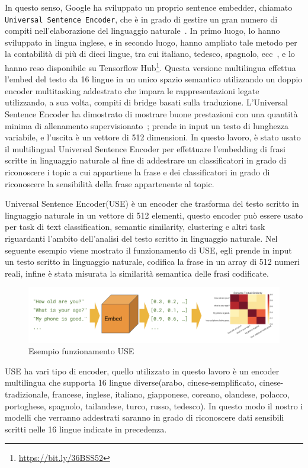In questo senso, Google ha sviluppato un proprio sentence embedder, chiamato {\tt Universal Sentence Encoder}, che è in grado di gestire un gran numero di compiti nell'elaborazione del linguaggio naturale~\cite{USE}. In primo luogo, lo hanno sviluppato in lingua inglese, e in secondo luogo, hanno ampliato tale metodo per la contabilità di più di dieci lingue, tra cui italiano, tedesco, spagnolo, ecc~\cite{yang2019multilingue}, e lo hanno reso disponibile su Tensorflow Hub\footnote{\url{https://bit.ly/36BSS52}}. Questa versione multilingua effettua l'embed del testo da 16 lingue in un unico spazio semantico utilizzando un doppio encoder multitasking addestrato che impara le rappresentazioni legate utilizzando, a sua volta, compiti di bridge basati sulla traduzione. L'Universal Sentence Encoder ha dimostrato di mostrare buone prestazioni con una quantità minima di allenamento supervisionato~\cite{USE}; prende in input un testo di lunghezza variabile, e l'uscita è un vettore di 512 dimensioni. In questo lavoro, è stato usato il multilingual Universal Sentence Encoder per effettuare l'embedding di frasi scritte in linguaggio naturale al fine di addestrare un classificatori in grado di riconoscere i topic a cui appartiene la frase e dei classificatori in grado di riconoscere la sensibilità della frase appartenente al topic.


Universal Sentence Encoder(USE) è un encoder che trasforma del testo scritto in linguaggio naturale in un vettore di 512 elementi, questo encoder può essere usato per task di text classification, semantic similarity, clustering e altri task riguardanti l'ambito dell'analisi del testo scritto in linguaggio naturale.\newline
Nel seguente esempio viene mostrato il funzionamento di USE, egli prende in input un testo scritto in linguaggio naturale, codifica la frase in un array di 512 numeri reali, infine è stata misurata la similarità semantica delle frasi codificate.
\begin{figure}[h]
    \centering
    \includegraphics [scale=0.4]{Figure/use.png}
    \caption{Esempio funzionamento USE}
    \label{fig:my_label}
\end{figure}
\FloatBarrier
USE ha vari tipo di encoder, quello utilizzato in questo lavoro è un encoder multilingua che supporta 16 lingue diverse(arabo, cinese-semplificato, cinese-tradizionale, francese, inglese, italiano, giapponese, coreano, olandese, polacco, portoghese, spagnolo, tailandese, turco, russo, tedesco). In questo modo il nostro i modelli che verranno addestrati saranno in grado di riconoscere dati sensibili scritti nelle 16 lingue indicate in precedenza.